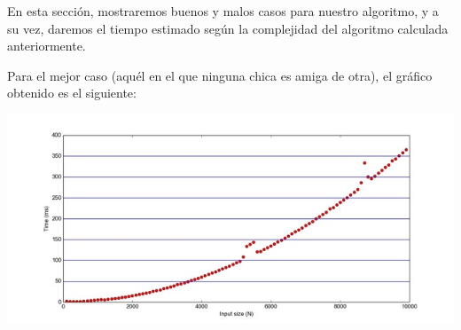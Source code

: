 \indent En esta secci\'on, mostraremos buenos y malos casos para nuestro algoritmo, y a su vez, daremos el tiempo estimado 
seg\'un la complejidad del algoritmo calculada anteriormente.

Para el mejor caso (aqu\'el en el que ninguna chica es amiga de otra), el gr\'afico obtenido es el siguiente:

\vspace*{0.3cm} \vspace*{0.3cm}
  \begin{center}
 \includegraphics[scale=0.8]{./EJ3/resized2.jpg}
  \end{center}
  \vspace*{0.3cm}

